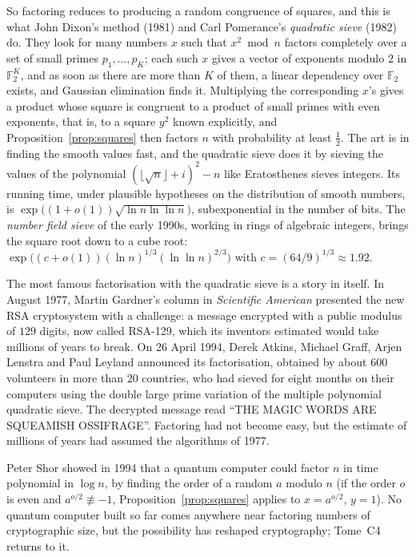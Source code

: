 So factoring reduces to producing a random congruence of squares, and this is what John Dixon's method (1981) and Carl Pomerance's \emph{quadratic sieve} (1982) do. They look for many numbers $x$ such that $x^2\bmod n$ factors completely over a set of small primes $p_1,\dots,p_K$; each such $x$ gives a vector of exponents modulo $2$ in $\mathbb F_2^K$, and as soon as there are more than $K$ of them, a linear dependency over $\mathbb F_2$ exists, and Gaussian elimination finds it. Multiplying the corresponding $x$'s gives a product whose square
is congruent to a product of small primes with even exponents, that is, to a square $y^2$ known explicitly, and Proposition~\ref{prop:squares} then factors $n$ with probability at least $\frac12$. The art is in finding the smooth values fast, and the quadratic sieve does it by sieving the values of the polynomial $(\lfloor\sqrt n\rfloor+i)^2-n$ like Eratosthenes sieves integers. Its running time, under plausible hypotheses on the distribution of smooth numbers, is
$\exp\bigl((1+o(1))\sqrt{\ln n\ln\ln n}\bigr)$, subexponential in the number of bits. The \emph{number field sieve} of the early 1990s, working in rings of algebraic integers, brings the square root down to a cube root: $\exp\bigl((c+o(1))(\ln n)^{1/3}(\ln\ln n)^{2/3}\bigr)$ with $c=(64/9)^{1/3}\approx1.92$.

The most famous factorisation with the quadratic sieve is a story in itself. In August 1977, Martin Gardner's column in \emph{Scientific American} presented the new RSA cryptosystem with a challenge: a message encrypted with a public modulus of $129$ digits, now called RSA-129, which its inventors estimated would take millions of years to break. On 26 April 1994, Derek Atkins, Michael Graff, Arjen Lenstra and Paul Leyland announced its factorisation, obtained by
about $600$ volunteers in more than $20$ countries, who had sieved for eight months on their computers using the double large prime variation of the multiple polynomial quadratic sieve. The decrypted message read ``THE MAGIC WORDS ARE SQUEAMISH OSSIFRAGE''. Factoring had not become easy, but the estimate of millions of years had assumed the algorithms of 1977.

\begin{remark}
Peter Shor showed in 1994 that a quantum computer could factor $n$ in time polynomial in $\log n$, by finding the order of a random $a$ modulo $n$ (if the order $o$ is even and $a^{o/2}\not\equiv-1$, Proposition~\ref{prop:squares} applies to $x=a^{o/2}$, $y=1$). No quantum computer built so far comes anywhere near factoring numbers of cryptographic size, but the possibility has reshaped cryptography; Tome~C4 returns to it.
\end{remark}

